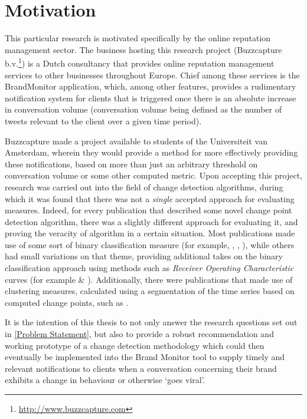 \documentclass{uvamscse}	%
\begin{document}

\section{Motivation}

This particular research is motivated specifically by the online reputation management sector. The business hosting this research project (Buzzcapture b.v.\footnote{\url{http://www.buzzcapture.com}}) is a Dutch consultancy that provides online reputation management services to other businesses throughout Europe. Chief among these services is the BrandMonitor application, which, among other features, provides a rudimentary notification system for clients that is triggered once there is an absolute increase in conversation volume (conversation volume being defined as the number of tweets relevant to the client over a given time period).

Buzzcapture made a project available to students of the Universiteit van Amsterdam, wherein they would provide a method for more effectively providing these notifications, based on more than just an arbitrary threshold on conversation volume or some other computed metric. Upon accepting this project, research was carried out into the field of change detection algorithms, during which it was found that there was not a \emph{single} accepted approach for evaluating measures. Indeed, for every publication that described some novel change point detection algorithm, there was a slightly different approach for evaluating it, and proving the veracity of algorithm in a certain situation. Most publications made use of some sort of binary classification measure (for example, \cite{Qahtan2015}, \cite{Buntain2014}, \cite{Pelecanos2010}), while others had small variations on that theme, providing additional takes on the binary classification approach using methods such as \emph{Receiver Operating Characteristic} curves (for example \cite{Fawcett1999} \& \cite{Desobry2005}). Additionally, there were publications that made use of clustering measures, calculated using a segmentation of the time series based on computed change points, such as \cite{Matteson2012}.

It is the intention of this thesis to not only answer the research questions set out in \autoref{Problem Statement}, but also to provide a robust recommendation and working prototype of a change detection methodology which could then eventually be implemented into the Brand Monitor tool to supply timely and relevant notifications to clients when a conversation concerning their brand exhibits a change in behaviour or otherwise `goes viral'.
\end{document}
